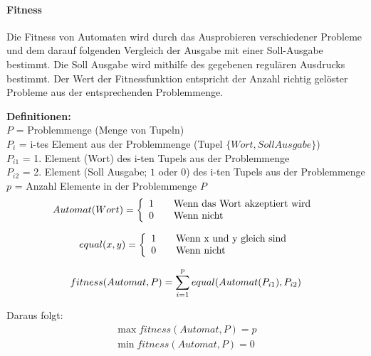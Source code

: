 \paragraph{Fitness}
Die Fitness von Automaten wird durch das Ausprobieren verschiedener Probleme und dem darauf folgenden Vergleich der Ausgabe mit einer Soll-Ausgabe bestimmt. Die Soll Ausgabe wird mithilfe des gegebenen regulären Ausdrucks bestimmt. Der Wert der Fitnessfunktion entspricht der Anzahl richtig gelöster Probleme aus der entsprechenden Problemmenge.

\textbf{Definitionen:}\\
$P$ = Problemmenge (Menge von Tupeln)\\
$P_i$ = i-tes Element aus der Problemmenge (Tupel $\{Wort, Soll Ausgabe\}$)\\
$P_{i1}$ = 1. Element (Wort) des i-ten Tupels aus der Problemmenge\\
$P_{i2}$ = 2. Element (Soll Ausgabe; $1$ oder $0$) des i-ten Tupels aus der Problemmenge\\
$p$ = Anzahl Elemente in der Problemmenge $P$\\

\begin{equation}
Automat(Wort) = \left\{ 
 \begin{array}{l l}
   1 & \quad \text{Wenn das Wort akzeptiert wird}\\
   0 & \quad \text{Wenn nicht}
 \end{array} \right.\\
\end{equation}

\begin{equation}
equal(x, y) = \left\{ 
 \begin{array}{l l}
   1 & \quad \text{Wenn x und y gleich sind}\\
   0 & \quad \text{Wenn nicht}
 \end{array} \right.
\end{equation}

\begin{equation}
fitness(Automat, P) = \sum_{i=1}^{p} equal(Automat(P_{i1}), P_{i2})\\
\end{equation}

Daraus folgt:\\
\begin{equation}
   \begin{split}
	\max fitness(Automat, P) = p\\
	\min fitness(Automat, P) = 0
   \end{split}
\end{equation}

